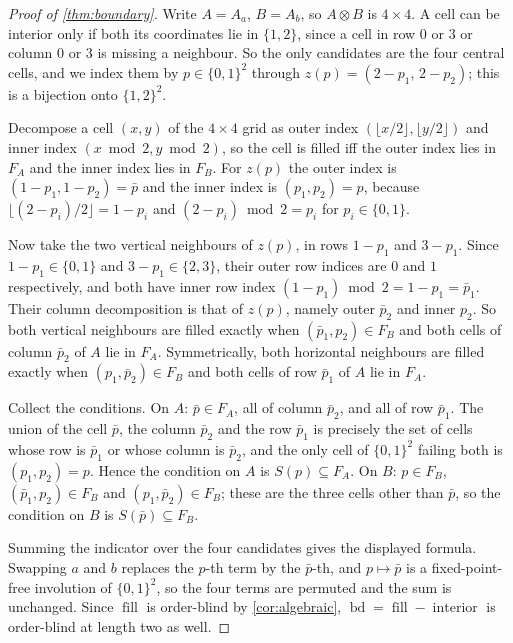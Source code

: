 \documentclass[11pt]{amsart}
\theoremstyle{definition}
\theoremstyle{remark}
\begin{document}
\begin{proof}[Proof of \cref{thm:boundary}]
Write $A = A_a$, $B = A_b$, so $A \otimes B$ is $4 \times 4$. A cell can be interior only if both its coordinates lie in $\{1,2\}$, since a cell in row $0$ or $3$ or column $0$ or $3$ is missing a neighbour. So the only candidates are the four central cells, and we index them by $p \in \{0,1\}^2$ through $z(p) = (2-p_1,\, 2-p_2)$; this is a bijection onto $\{1,2\}^2$.

Decompose a cell $(x,y)$ of the $4 \times 4$ grid as outer index $(\lfloor x/2 \rfloor, \lfloor y/2 \rfloor)$ and inner index $(x \bmod 2, y \bmod 2)$, so the cell is filled iff the outer index lies in $F_A$ and the inner index lies in $F_B$. For $z(p)$ the outer index is $(1-p_1, 1-p_2) = \bar p$ and the inner index is $(p_1,p_2) = p$, because $\lfloor (2-p_i)/2 \rfloor = 1-p_i$ and $(2-p_i) \bmod 2 = p_i$ for $p_i \in \{0,1\}$.

Now take the two vertical neighbours of $z(p)$, in rows $1-p_1$ and $3-p_1$. Since $1-p_1 \in \{0,1\}$ and $3-p_1 \in \{2,3\}$, their outer row indices are $0$ and $1$ respectively, and both have inner row index $(1-p_1) \bmod 2 = 1-p_1 = \bar p_1$. Their column decomposition is that of $z(p)$, namely outer $\bar p_2$ and inner $p_2$. So both vertical neighbours are filled exactly when $(\bar p_1, p_2) \in F_B$ and both cells of column $\bar p_2$ of $A$ lie in $F_A$. Symmetrically, both horizontal neighbours are filled exactly when $(p_1, \bar p_2) \in F_B$ and both cells of row $\bar p_1$ of $A$ lie in $F_A$.

Collect the conditions. On $A$: $\bar p \in F_A$, all of column $\bar p_2$, and all of row $\bar p_1$. The union of the cell $\bar p$, the column $\bar p_2$ and the row $\bar p_1$ is precisely the set of cells whose row is $\bar p_1$ or whose column is $\bar p_2$, and the only cell of $\{0,1\}^2$ failing both is $(p_1,p_2) = p$. Hence the condition on $A$ is $S(p) \subseteq F_A$. On $B$: $p \in F_B$, $(\bar p_1, p_2) \in F_B$ and $(p_1, \bar p_2) \in F_B$; these are the three cells other than $\bar p$, so the condition on $B$ is $S(\bar p) \subseteq F_B$.

Summing the indicator over the four candidates gives the displayed formula. Swapping $a$ and $b$ replaces the $p$-th term by the $\bar p$-th, and $p \mapsto \bar p$ is a fixed-point-free involution of $\{0,1\}^2$, so the four terms are permuted and the sum is unchanged. Since $\operatorname{fill}$ is order-blind by \cref{cor:algebraic}, $\operatorname{bd} = \operatorname{fill} - \operatorname{interior}$ is order-blind at length two as well.
\end{proof}
\end{document}
